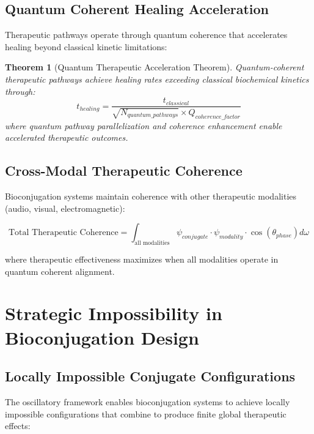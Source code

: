 \documentclass[12pt,a4paper]{article}
\newtheorem{theorem}{Theorem}
\begin{document}
\subsection{Quantum Coherent Healing Acceleration}

Therapeutic pathways operate through quantum coherence that accelerates healing beyond classical kinetic limitations:

\begin{theorem}[Quantum Therapeutic Acceleration Theorem]
Quantum-coherent therapeutic pathways achieve healing rates exceeding classical biochemical kinetics through:
\begin{equation}
t_{healing} = \frac{t_{classical}}{\sqrt{N_{quantum\_pathways}} \times Q_{coherence\_factor}}
\end{equation}
where quantum pathway parallelization and coherence enhancement enable accelerated therapeutic outcomes.
\end{theorem}

\subsection{Cross-Modal Therapeutic Coherence}

Bioconjugation systems maintain coherence with other therapeutic modalities (audio, visual, electromagnetic):

\begin{equation}
\text{Total Therapeutic Coherence} = \int_{\text{all modalities}} \psi_{conjugate} \cdot \psi_{modality} \cdot \cos(\theta_{phase}) d\omega
\end{equation}

where therapeutic effectiveness maximizes when all modalities operate in quantum coherent alignment.

\section{Strategic Impossibility in Bioconjugation Design}

\subsection{Locally Impossible Conjugate Configurations}

The oscillatory framework enables bioconjugation systems to achieve locally impossible configurations that combine to produce finite global therapeutic effects:
\end{document}
